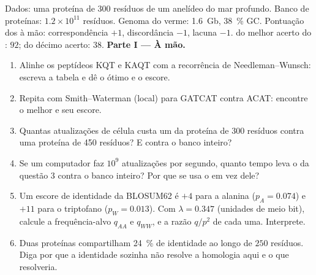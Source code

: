 \begin{problem}
\label{pb:b3:bioinformatics:1}
Dados: uma proteína de \num{300} resíduos de um anelídeo do mar
profundo. Banco de proteínas: $1.2\times 10^{11}$ resíduos. Genoma do
verme: \qty{1.6}{Gb}, \qty{38}{\%} GC. Pontuação dos  à
mão: correspondência $+1$, discordância $-1$, lacuna $-1$.  do melhor acerto do : $92$; do décimo acerto: $38$.
\medskip
\noindent\textbf{Parte I --- À mão.}
\begin{enumerate}
  \item Alinhe os peptídeos KQT e KAQT com a recorrência de
        Needleman--Wunsch: escreva a tabela e dê o  ótimo e
        o escore.
  \item Repita com Smith--Waterman (local) para GATCAT contra ACAT:
        encontre o melhor  e seu escore.
  \item Quantas atualizações de célula custa um  da
        proteína de \num{300} resíduos contra uma proteína de
        \num{450} resíduos? E contra o banco inteiro?
  \item Se um computador faz $10^{9}$ atualizações por segundo, quanto
        tempo leva o  da questão 3 contra o banco inteiro?
        Por que se usa o  em vez dele?
  \item Um escore de identidade da BLOSUM62 é $+4$ para a alanina
        ($p_{A} =
        0.074$) e $+11$ para o triptofano ($p_{W} = 0.013$).
        Com $\lambda = 0.347$ (unidades de meio bit), calcule a
        frequência-alvo $q_{AA}$ e $q_{WW}$, e a razão $q/p^{2}$ de
        cada uma. Interprete.
  \item Duas proteínas compartilham \qty{24}{\%} de identidade ao longo
        de $250$ resíduos. Diga por que a identidade sozinha não
        resolve a homologia aqui e o que resolveria.
\end{enumerate}


\end{problem}
